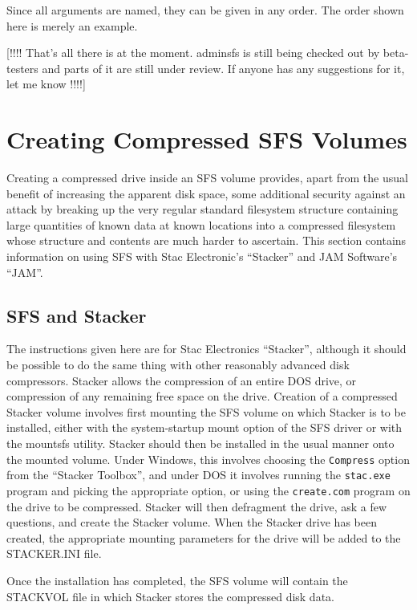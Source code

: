 Since all arguments are named, they can be given in any order.  The order shown
here is merely an example.

[!!!! That's all there is at the moment.  adminsfs is still being checked
      out by beta-testers and parts of it are still under review.  If anyone
      has any suggestions for it, let me know !!!!]


\section{Creating Compressed SFS Volumes}

Creating a compressed drive inside an SFS volume provides, apart from the usual
benefit of increasing the apparent disk space, some additional security against
an attack by breaking up the very regular standard filesystem structure
containing large quantities of known data at known locations into a compressed
filesystem whose structure and contents are much harder to ascertain.
This section contains information on using SFS with Stac Electronic's ``Stacker''
and JAM Software's ``JAM''.

\subsection{SFS and Stacker}

The instructions given here are for Stac Electronics ``Stacker'', although it
should be possible to do the same thing with other reasonably advanced disk
compressors.  Stacker allows the compression of an entire DOS drive, or
compression of any remaining free space on the drive.  Creation of a compressed
Stacker volume involves first mounting the SFS volume on which Stacker is to be
installed, either with the system-startup mount option of the SFS driver or 
with the mountsfs utility.  Stacker should then be installed in the usual 
manner onto the mounted volume.  Under Windows, this involves choosing the 
{\tt Compress} option from the ``Stacker Toolbox'', and under DOS it involves running 
the {\tt stac.exe} program and picking the appropriate option, or using the 
{\tt create.com} program on the drive to be compressed.  Stacker will then 
defragment the drive, ask a few questions, and create the Stacker volume.  When 
the Stacker drive has been created, the appropriate mounting parameters for the 
drive will be added to the STACKER.INI file.

Once the installation has completed, the SFS volume will contain the STACKVOL
file in which Stacker stores the compressed disk data.

